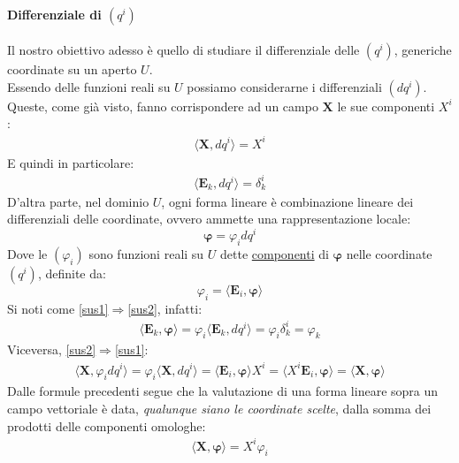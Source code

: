 \documentclass[10pt,a4paper]{book}
\begin{document}
\paragraph{Differenziale di $(q^i)$} Il nostro obiettivo adesso è quello di studiare il differenziale delle $(q^i)$, generiche coordinate su un aperto $U$.\\
Essendo delle funzioni reali su $U$ possiamo considerarne i differenziali $(dq^i)$. Queste, come già visto, fanno corrispondere ad un campo $\mathbf{X}$ le sue componenti $X^i$:
\begin{align*}
    \langle\mathbf{X},dq^i\rangle=X^i
\end{align*}
E quindi in particolare:
\begin{align*}
    \langle \mathbf{E}_k,dq^i\rangle=\delta_k^i
\end{align*}
D'altra parte, nel dominio $U$, ogni forma lineare è combinazione lineare dei differenziali delle coordinate, ovvero ammette una rappresentazione locale:
\begin{equation}
    \label{sus1}
    \mathbf{\varphi}=\varphi_idq^i
\end{equation}
Dove le $(\varphi_i)$ sono funzioni reali su $U$ dette \underline{componenti} di $\mathbf{\varphi}$ nelle coordinate $(q^i)$, definite da:
\begin{equation}
    \label{sus2}
    \varphi_i=\langle\mathbf{E}_i,\mathbf{\varphi}\rangle
\end{equation}
Si noti come \ref{sus1}$\Rightarrow$\ref{sus2}, infatti:
\begin{align*}
    \langle \mathbf{E}_k,\mathbf{\varphi}\rangle = \varphi_i\langle \mathbf{E}_k,dq^i\rangle = \varphi_i \delta_k^i=\varphi_k
\end{align*}
Viceversa, \ref{sus2}$\Rightarrow$\ref{sus1}:
\begin{align*}
    \langle \mathbf{X},\varphi_idq^i\rangle=\varphi_i \langle \mathbf{X},dq^i\rangle= \langle \mathbf{E}_i, \mathbf{\varphi}\rangle X^i=\langle X^i\mathbf{E}_i, \mathbf{\varphi}\rangle =\langle \mathbf{X}, \mathbf{\varphi}\rangle
\end{align*}
Dalle formule precedenti segue che la valutazione di una forma lineare sopra un campo vettoriale è data, \textit{qualunque siano le coordinate scelte}, dalla somma dei prodotti delle componenti omologhe:
\begin{align*}
    \boxed{\langle \mathbf{X},\mathbf{\varphi}\rangle = X^i\varphi_i}
\end{align*}
\end{document}
